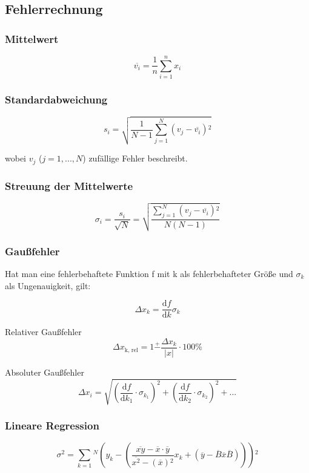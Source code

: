 \subsection{Fehlerrechnung}
\label{subsec:fehlerrechnung}

\subsubsection{Mittelwert}
\begin{equation}
\overline{v_i} = \frac{1}{n} \sum_{i=1}^n x_i
\end{equation}

\subsubsection{Standardabweichung}
\begin{equation}
s_i = \sqrt{\frac{1}{N - 1} \sum_{j=1}^N \left(v_j - \overline{v_i}\right){^2}}
\end{equation}

wobei $v_j$ ($j = 1, ..., N$) zufällige Fehler beschreibt.

\subsubsection{Streuung der Mittelwerte}
\begin{equation}
\sigma_i = \frac{s_i}{\sqrt{N}} = \sqrt{\frac{\sum_{j=1}^N \left(v_j - \overline{v_i}\right){^2}}{N \left(N - 1 \right)}}
\end{equation}

\subsubsection{Gaußfehler}
Hat man eine fehlerbehaftete Funktion f mit k als fehlerbehafteter Größe und $\sigma_k$ als Ungenauigkeit, gilt:

\begin{equation}
\Delta x_k = \frac{\mathrm{d}f}{\mathrm{d}k}\sigma_k
\end{equation}

Relativer Gaußfehler
\begin{equation}
\Delta x_\text{k, rel} = 1 \stackrel{+}{-} \frac{\Delta x_k}{|x|}\cdot 100\%
\end{equation}

Absoluter Gaußfehler
\begin{equation}
\Delta x_i = \sqrt{\left(\frac{\mathrm{d}f}{\mathrm{d}k_{1}}\cdot \sigma_{k_{1}}\right)^2 + \left(\frac{\mathrm{d}f}{\mathrm{d}k_{2}}\cdot \sigma_{k_{2}}\right)^2 + ...}
\end{equation}

\subsubsection{Lineare Regression}
\begin{equation}
\sigma {^2} = \sum_{k=1}{^N} \left(y_k - \left(\frac{\overline{xy} - \overline{x}\cdot\overline{y}}{\overline{x^2} - (\overline{x}){^2}}x_k + \left(\overline{y} - \overline{B}\overline{x}\overline{B}\right)\right)\right){^2}
\end{equation}
